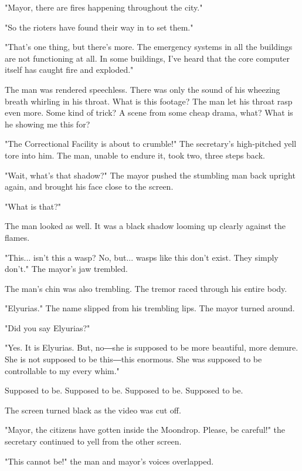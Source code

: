 "Mayor, there are fires happening throughout the city."

"So the rioters have found their way in to set them."

"That's one thing, but there's more. The emergency systems in all the
buildings are not functioning at all. In some buildings, I've heard that
the core computer itself has caught fire and exploded."

The man was rendered speechless. There was only the sound of his
wheezing breath whirling in his throat. What is this footage? The man
let his throat rasp even more. Some kind of trick? A scene from some
cheap drama, what? What is he showing me this for?

"The Correctional Facility is about to crumble!" The secretary's
high-pitched yell tore into him. The man, unable to endure it, took two,
three steps back.

"Wait, what's that shadow?" The mayor pushed the stumbling man back
upright again, and brought his face close to the screen.

"What is that?"

The man looked as well. It was a black shadow looming up clearly against
the flames.

"This... isn't this a wasp? No, but... wasps like this don't exist. They
simply don't." The mayor's jaw trembled.

The man's chin was also trembling. The tremor raced through his entire
body.

"Elyurias." The name slipped from his trembling lips. The mayor turned
around.

"Did you say Elyurias?"

"Yes. It is Elyurias. But, no―she is supposed to be more beautiful, more
demure. She is not supposed to be this―this enormous. She was supposed
to be controllable to my every whim."

Supposed to be. Supposed to be. Supposed to be. Supposed to be.

The screen turned black as the video was cut off.

"Mayor, the citizens have gotten inside the Moondrop. Please, be
careful!" the secretary continued to yell from the other screen.

"This cannot be!" the man and mayor's voices overlapped.

\hypertarget{index_split_002.htmlux5cux23calibre_pb_4}{}

\protect\hypertarget{index_split_003.html}{}{}

